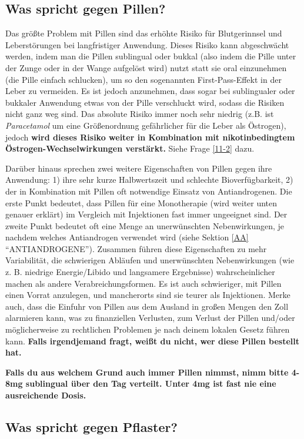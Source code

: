 \documentclass{article}
\begin{document}
\subsection{Was spricht gegen Pillen?}

Das größte Problem mit Pillen sind das erhöhte Risiko für Blutgerinnsel und Leberstörungen bei langfristiger Anwendung. Dieses Risiko kann abgeschwächt werden, indem man die Pillen sublingual oder bukkal (also indem die Pille unter der Zunge oder in der Wange aufgelöst wird) nutzt statt sie oral einzunehmen (die Pille einfach schlucken), um so den sogenannten First-Pass-Effekt in der Leber zu vermeiden. Es ist jedoch anzunehmen, dass sogar bei sublingualer oder bukkaler Anwendung etwas von der Pille verschluckt wird, sodass die Risiken nicht ganz weg sind. Das absolute Risiko immer noch sehr niedrig (z.B. ist \textit{Paracetamol} um eine Größenordnung gefährlicher für die Leber als Östrogen), jedoch \textbf{wird dieses Risiko weiter in Kombination mit nikotinbedingtem Östrogen-Wechselwirkungen verstärkt.} Siehe Frage \ref{11-2} dazu.

Darüber hinaus sprechen zwei weitere Eigenschaften von Pillen gegen ihre Anwendung: 1) ihre sehr kurze Halbwertszeit und schlechte Bioverfügbarkeit, 2) der in Kombination mit Pillen oft notwendige Einsatz von Antiandrogenen. Die erste Punkt bedeutet, dass Pillen für eine Monotherapie (wird weiter unten genauer erklärt) im Vergleich mit Injektionen fast immer ungeeignet sind. Der zweite Punkt bedeutet oft eine Menge an unerwünschten Nebenwirkungen, je nachdem welches Antiandrogen verwendet wird (siehe Sektion \ref{AA} “ANTIANDROGENE”). Zusammen führen diese Eigenschaften zu mehr Variabilität, die schwierigen Abläufen und unerwünschten Nebenwirkungen (wie z. B. niedrige Energie/Libido und langsamere Ergebnisse) wahrscheinlicher machen als andere Verabreichungsformen. Es ist auch schwieriger, mit Pillen einen Vorrat anzulegen, und mancherorts sind sie teurer als Injektionen. Merke auch, dass die Einfuhr von Pillen aus dem Ausland in großen Mengen den Zoll alarmieren kann, was zu finanziellen Verlusten, zum Verlust der Pillen und/oder möglicherweise zu rechtlichen Problemen je nach deinem lokalen Gesetz führen kann. \textbf{Falls irgendjemand fragt, weißt du nicht, wer diese Pillen bestellt hat.}

\textbf{Falls du aus welchem Grund auch immer Pillen nimmst, nimm bitte 4-8mg sublingual über den Tag verteilt. Unter 4mg ist fast nie eine ausreichende Dosis.}

\subsection{Was spricht gegen Pflaster?}
\end{document}
